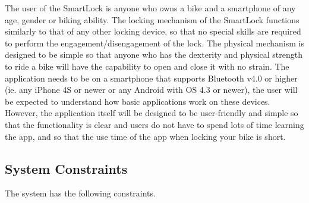 \documentclass[12pt]{article}
\begin{document}
The user of the SmartLock is anyone who owns a bike and a smartphone of any age, gender or biking ability.  The locking mechanism of the SmartLock functions similarly to that of any other locking device, so that no special skills are required to perform the engagement/disengagement of the lock.  The physical mechanism is designed to be simple so that anyone who has the dexterity and physical strength to ride a bike will have the capability to open and close it with no strain.  The application needs to be on a smartphone that supports Bluetooth v4.0 or higher (ie. any iPhone 4S or newer or any Android with OS 4.3 or newer), the user will be expected to understand how basic applications work on these devices.  However, the application itself will be designed to be user-friendly and simple so that the functionality is clear and users do not have to spend lots of time learning the app, and so that the use time of the app when locking your bike is short. 

\subsection{System Constraints}

The system has the following constraints.
\end{document}
